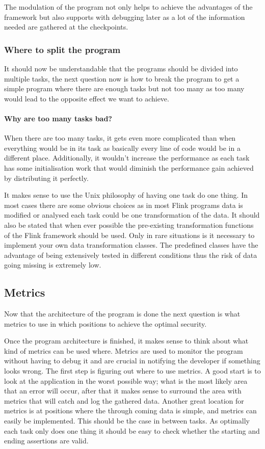 The modulation of the program not only helps to achieve the advantages of the framework but also supports with debugging later as a lot of the information needed are gathered at the checkpoints.

\subsubsection{Where to split the program}
It should now be understandable that the programs should be divided into multiple tasks, the next question now is how to break the program to get a simple program where there are enough tasks but not too many as too many would lead to the opposite effect we want to achieve.

\paragraph{Why are too many tasks bad?} When there are too many tasks, it gets even more complicated than when everything would be in its task as basically every line of code would be in a different place. Additionally, it wouldn't increase the performance as each task has some initialisation work that would diminish the performance gain achieved by distributing it perfectly.

It makes sense to use the Unix philosophy of having one task do one thing. In most cases there are some obvious choices as in most Flink programs data is modified or analysed each task could be one transformation of the data. It should also be stated that when ever possible the pre-existing transformation functions of the Flink framework should be used. Only in rare situations is it necessary to implement your own data transformation classes. The predefined classes have the advantage of being extensively tested in different conditions thus the risk of data going missing is extremely low.

\subsection{Metrics}
Now that the architecture of the program is done the next question is what metrics to use in which positions to achieve the optimal security.

Once the program architecture is finished, it makes sense to think about what kind of metrics can be used where. Metrics are used to monitor the program without having to debug it and are crucial in notifying the developer if something looks wrong. The first step is figuring out where to use metrics. A good start is to look at the application in the worst possible way; what is the most likely area that an error will occur, after that it makes sense to surround the area with metrics that will catch and log the gathered data. Another great location for metrics is at positions where the through coming data is simple, and metrics can easily be implemented. This should be the case in between tasks. As optimally each task only does one thing it should be easy to check whether the starting and ending assertions are valid.

